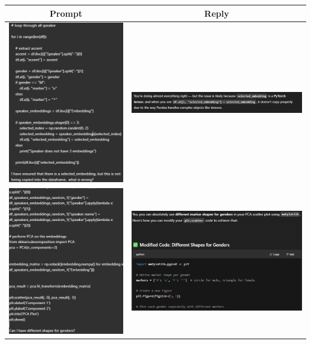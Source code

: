 \documentclass[conference]{IEEEtran}
\begin{document}
	
	\begin{table}[htbp]
		\begin{tabular}{|c|c|}
		\hline
		Prompt & Reply \\
		\hline
		\hline
		\includegraphics[width=0.5\linewidth]{img/img-chatgpt-prompt-1}
		&
		\includegraphics[width=0.5\linewidth]{img/img-chatgpt-reply-1}
		\\
		\hline
		\includegraphics[width=0.5\linewidth]{img/img-chatgpt-prompt-2}
		& 
		\includegraphics[width=0.5\linewidth]{img/img-chatgpt-reply-2}

\end{tabular}
\end{table}
\end{document}
